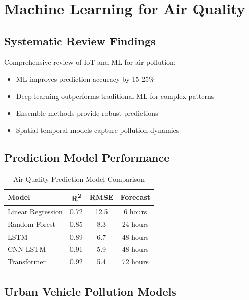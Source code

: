 \documentclass[12pt,a4paper]{article}
\begin{document}
\section{Machine Learning for Air Quality}

\subsection{Systematic Review Findings}

Comprehensive review of IoT and ML for air pollution:
\begin{itemize}
    \item ML improves prediction accuracy by 15-25\%
    \item Deep learning outperforms traditional ML for complex patterns
    \item Ensemble methods provide robust predictions
    \item Spatial-temporal models capture pollution dynamics
\end{itemize}

\subsection{Prediction Model Performance}

\begin{table}[H]
\centering
\caption{Air Quality Prediction Model Comparison}
\begin{tabular}{lccc}
\toprule
\textbf{Model} & \textbf{R\textsuperscript{2}} & \textbf{RMSE} & \textbf{Forecast} \\
\midrule
Linear Regression & 0.72 & 12.5 & 6 hours \\
Random Forest & 0.85 & 8.3 & 24 hours \\
LSTM & 0.89 & 6.7 & 48 hours \\
CNN-LSTM & 0.91 & 5.9 & 48 hours \\
Transformer & 0.92 & 5.4 & 72 hours \\
\bottomrule
\end{tabular}
\end{table}

\subsection{Urban Vehicle Pollution Models}
\end{document}
